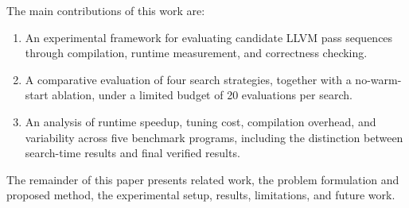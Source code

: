 The main contributions of this work are:
\begin{enumerate}[leftmargin=*,itemsep=1pt]
\item An experimental framework for evaluating candidate LLVM pass sequences through compilation, runtime measurement, and correctness checking.
\item A comparative evaluation of four search strategies, together with a no-warm-start ablation, under a limited budget of 20 evaluations per search.
\item An analysis of runtime speedup, tuning cost, compilation overhead, and variability across five benchmark programs, including the distinction between search-time results and final verified results.
\end{enumerate}
The remainder of this paper presents related work, the problem formulation and proposed method, the experimental setup, results, limitations, and future work.
